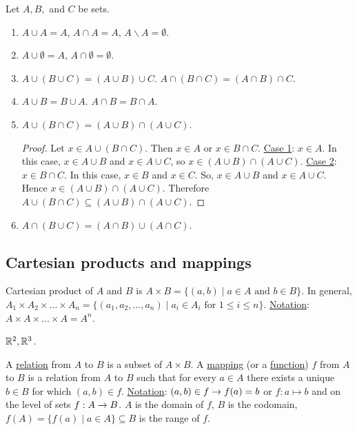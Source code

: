 \documentclass[]{article}
\begin{document}
\begin{proposition}
	Let $A,B,$ and $C$ be sets.
	\begin{enumerate}
		\item $A\cup A = A$, $A\cap A = A$, $A\backslash A = \emptyset $.
		\item $A\cup \emptyset = A$, $A\cap \emptyset = \emptyset$.
		\item $A\cup (B\cup C) = (A\cup B)\cup C$.
		$A\cap (B\cap C) = (A\cap B) \cap C$.
		\item $A\cup B = B\cup A$. $A\cap B = B\cap A$.
		\item $A\cup (B\cap C) = (A\cup B) \cap (A\cup C)$.
		\begin{proof}
			Let $x\in A\cup (B\cap C)$. Then $x\in A$ or $x\in B\cap C$. \ul{Case 1}: $x\in A$. In this case, $x\in A\cup B$ and $x\in A\cup C$, so $x\in (A\cup B)\cap (A\cup C)$. \ul{Case 2}: $x\in B\cap C$. In this case, $x \in B$ and $x\in C$. So, $x\in A\cup B$ and $x\in A\cup C$. Hence $x \in (A\cup B)\cap (A\cup C)$. Therefore $A\cup (B\cap C) \subseteq (A\cup B)\cap (A\cup C)$.
		\end{proof}
		\item $A\cap (B\cup C) = (A\cap B) \cup (A\cap C)$.
	\end{enumerate}
\end{proposition}

\subsection*{Cartesian products and mappings}

Cartesian product of $A$ and $B$ is $A\times B = \{(a,b)\mid a\in A \text{ and } b\in B\}$.
In general, $A_1\times A_2\times\dots\times A_n = \{(a_1,a_2,\dots,a_n)\mid a_i\in A_i \text{ for } 1\leq i \leq n\}$.
\ul{Notation}: $A\times A\times \dots\times A = A^n$.

\begin{example}
	$\mathbb{R}^2, \mathbb{R}^3$.
\end{example}

A \ul{relation} from $A$ to $B$ is a subset of $A\times B$.
A \ul{mapping} (or a \ul{function}) $f$ from $A$ to $B$ is a relation from $A$ to $B$ such that for every $a\in A$ there exists a unique $b\in B$ for which $(a,b)\in f$. \ul{Notation}: $(a,b) \in f \rightarrow f(a) = b$ or $f:a\mapsto b$ and on the level of sets $f:A\rightarrow B$. $A$ is the domain of $f$, $B$ is the codomain, $f(A) = \{f(a)\mid a\in A\}\subseteq B$ is the range of $f$.
\end{document}
